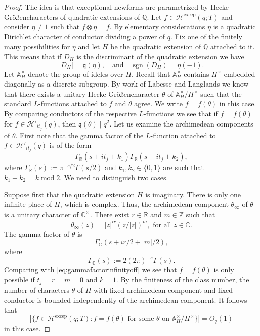 \documentclass{article}
\theoremstyle{named}
\newcommand{\HH}{\mathcal{H}}
\newcommand{\Z}{\mathbb{Z}}
\newcommand{\A}{\mathbb{A}}
\newcommand{\Q}{\mathbb{Q}}
\newcommand{\q}{\mathfrak{q}}
\newcommand{\CC}{\mathbb{C}}
\newcommand{\R}{\mathbb{R}}
\DeclareMathOperator{\sgn}{sgn}
\DeclareMathOperator{\modulo}{mod}
\begin{document}
\begin{proof}
The idea is that exceptional newforms are parametrized by Hecke Größencharacters of quadratic extensions of $\Q$. Let $f \in \HH^{\text{excep}}(q; T)$ and consider $\eta \neq 1$ such that $f \otimes \eta = f$. By elementary considerations $\eta$ is a  quadratic Dirichlet character of conductor dividing a power of $q$. Fix one of the finitely many possibilities for $\eta$ and let $H$ be the quadratic extension of $\Q$ attached to it. This means that if $D_H$ is the discriminant of the quadratic extension we have 
\begin{equation*}
    |D_{H}| = \q(\eta), \quad \text{and}\quad \sgn(D_{H}) = \eta(-1).
\end{equation*}
Let $\A_{H}^\times$ denote the group of ideles over $H$. Recall that $\A_H^\times$ contains $H^\times$ embedded diagonally as a discrete subgroup. By work of Labesse and Langlands \cite[Proposition 6.5]{Labesse_Langlands_1979} we know that there exists a unitary Hecke Größencharacter $\theta$ of $\A_{H}^\times/H^\times$ such that the standard $L$-functions attached to $f$ and $\theta$ agree. We write $f = f(\theta)$ in this case. By comparing conductors of the respective $L$-functions we see that if $f = f(\theta)$ for $f \in \HH'_{it_j}(q)$, then $\q(\theta) \mid q^2$. Let us examine the archimedean components of $\theta$. First note that the gamma factor of the $L$-function attached to $f \in \HH'_{it_j}(q)$ is of the form 
\begin{equation}\label{eq:gammafactorinfinityoff}
    \Gamma_\R(s + it_j + k_1)\Gamma_\R(s - it_j + k_2),
\end{equation}
where $\Gamma_\R(s) := \pi^{-s/2}\Gamma(s/2)$ and $k_1, k_2 \in \{0, 1\}$ are such that $k_1 + k_2 = k \modulo 2$. 
We need to distinguish two cases.

Suppose first that the quadratic extension $H$ is imaginary. There is only one infinite place of $H$, which is complex. Thus, the archimedean component $\theta_\infty$ of $\theta$ is a unitary character of $\CC^\times$. There exist $r \in \R$ and $m \in \Z$ such that 
\begin{equation*}
    \theta_\infty(z) = |z|^{ir} (z/|z|)^m, \text{ for all }z \in \CC.
\end{equation*}
The gamma factor of $\theta$ is 
\begin{equation*}
    \Gamma_\CC(s + ir/2 + |m|/2),
\end{equation*}
where 
\begin{equation*}
    \Gamma_\CC(s) := 2 (2\pi)^{-s}\Gamma(s).
\end{equation*}
Comparing with \eqref{eq:gammafactorinfinityoff} we see that $f = f(\theta)$ is only possible if $t_j = r = m = 0$ and $k = 1$. By the finiteness of the class number, the number of characters $\theta$ of $H$ with fixed archimedean component and fixed conductor is bounded independently of the archimedean component. It follows that  
    \begin{equation*}
        |\{f \in \HH^{\text{excep}}(q; T): f = f(\theta) \text{ for some }\theta \text{ on } \A_{H}^\times/H^\times\}| = O_q(1)
    \end{equation*} 
in this case. 



\end{proof}
\end{document}
